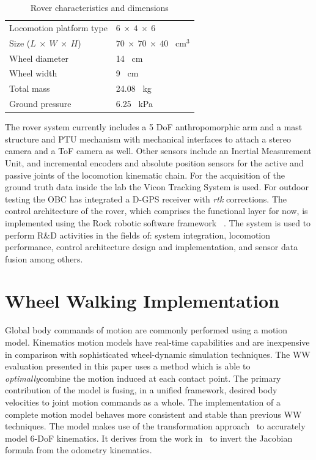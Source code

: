\documentclass[a4paper,twocolumn]{esapub2005} %
\begin{document}
\begin{table}[h]
	\begin{tabular}{ll}
	Locomotion platform type       & $6~\times~4~\times~6$             \\
	Size ($L~\times~W~\times~H$)   & $70~\times~70~\times~40$ ~\unit{cm$^3$} \\
	Wheel diameter                 & 14 ~\unit{cm}    \\
	Wheel width                    & 9 ~\unit{cm}     \\
	Total mass                     & 24.08 ~\unit{kg} \\
	Ground pressure                & 6.25 ~\unit{kPa}        
	\end{tabular}
	\caption{Rover characteristics and dimensions}
	\label{tab:ExoterDimensionsTable}
\end{table}

The rover system currently includes a 5 DoF anthropomorphic arm and a mast structure and PTU mechanism with mechanical interfaces to attach a stereo camera and a ToF camera as well. Other sensors include an Inertial Measurement Unit, and incremental encoders and absolute position sensors for the active and passive joints of the locomotion kinematic chain. For the acquisition of the ground truth data inside the lab the Vicon Tracking System is used. For outdoor testing the OBC has integrated a D-GPS receiver with \textit{rtk} corrections. The control architecture of the rover, which comprises the functional layer for now, is implemented using the Rock robotic software framework ~\cite{}. The system is used to perform R\&D activities in the fields of: system integration, locomotion performance, control architecture design and implementation, and sensor data fusion among others. 

\section{Wheel Walking Implementation}

Global body commands of motion are commonly performed using a motion model.
Kinematics motion models have real-time capabilities and are inexpensive in
comparison with sophisticated wheel-dynamic simulation techniques.  The
WW evaluation presented in this paper uses a method which is able to
\textit{optimally}\footnotemark[1] combine the motion induced at each contact
point. The primary contribution of the model is fusing, in a unified framework,
desired body velocities to joint motion commands as a whole.  The
implementation of a complete motion model behaves more consistent and stable
than previous WW techniques. The model makes use of the
transformation approach~\cite{Tarokh2005} to accurately model 6-DoF kinematics.
It derives from the work in~\cite{Hidalgo-Carrio2014} to invert the Jacobian
formula from the odometry kinematics.
\end{document}
